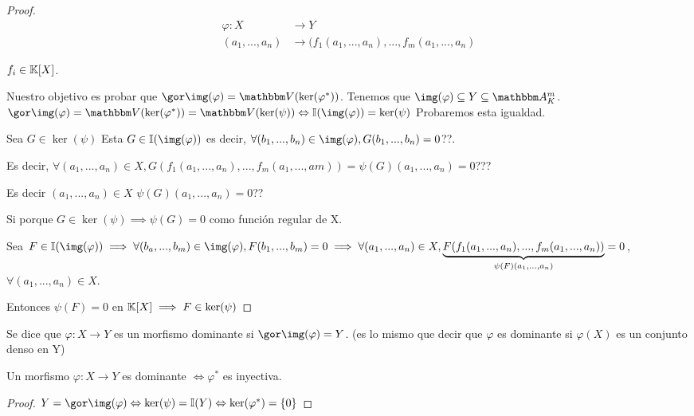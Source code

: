 \begin{proof}
	\begin{align*}
		\varphi: X & \rightarrow Y \\
		(a_1,...,a_n) & \rightarrow (f_1(a_1,...,a_n),...,f_m(a_1,...,a_n)
	\end{align*}
	
	$f_i \in \mathbb{K}[X]$.
	
	Nuestro objetivo es probar que $\cls{\img(\varphi)}=\V(\ker(\varphi^*))$. Tenemos que $\img(\varphi) \subseteq Y \subseteq \A_K^m$. $\cls{\img(\varphi)}=\V(\ker(\varphi^*))=\V(\ker(\psi)) \Leftrightarrow \I(\img(\varphi))=\ker(\psi)$ Probaremos esta igualdad.
	
	\proofpart{	$\ker(\psi) \subset \I(\img(\varphi))$:}

	
	Sea $G \in \ker(\psi)$ Esta $G \in \I(\img(\varphi))$ es decir, $\forall (b_1,...,b_n) \in \img(\varphi), G(b_1,...,b_n)=0$??.
	
	Es decir, $\forall (a_1,...,a_n) \in X, G(f_1(a_1,...,a_n),...,f_m(a_1,...,am))=\psi(G)(a_1,...,a_n)=0$???
	
	Es decir $(a_1,...,a_n) \in X$ $\psi(G)(a_1,...,a_n)=0$??
	
	Si porque $G \in \ker(\psi) \implies \psi(G)=0$ como función regular de X.
	
	\proofpart{$\ker(\psi) \supset \I(\img(\varphi))$:}
	
	
	Sea $F \in \I(\img(\varphi)) \implies \forall (b_a,...,b_m) \in  \img(\varphi), F(b_1,...,b_m)=0 \implies \forall(a_1,...,a_n) \in X, \underbrace{F(f_1(a_1,...,a_n),...,f_m(a_1,...,a_n))}_{\psi(F)(a_1,...,a_n)}=0$, $\forall (a_1,...,a_n) \in X$.
	
	Entonces $\psi(F)=0$ en $\mathbb{K}[X] \implies F \in \ker(\psi)$
\end{proof}


\begin{defn}
	Se dice que $\varphi: X \rightarrow Y$ es un morfismo dominante si $\cls{\img(\varphi)}=Y$. (es lo mismo que decir que $\varphi$ es dominante si $\varphi(X)$ es un conjunto denso en Y)
\end{defn}

\begin{corol}
	Un morfismo $\varphi: X \rightarrow Y$ es dominante $\Leftrightarrow \varphi^*$ es inyectiva.
\end{corol}

\begin{proof}
	$Y=\cls{\img(\varphi)} \Leftrightarrow \ker(\psi)=\I(Y) \Leftrightarrow \ker(\varphi^*)=\{0\}$
\end{proof}

